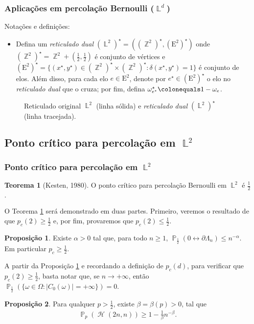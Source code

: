 \documentclass[9pt]{beamer}
\theoremstyle{definition} %
\newtheorem{mythm}{Teorema}
\newtheorem{mypro}{Proposição}
\DeclareMathOperator{\PX}{\mathbb{P}} %
\DeclareMathOperator{\ZX}{\mathbb{Z}} %
\DeclareMathOperator{\LX}{\mathbb{L}} %
\DeclareMathOperator{\HL}{\mathcal{H}} %
\newenvironment{myitemize}
{ \begin{itemize}
	\setlength{\itemsep}{6pt}
	\setlength{\parskip}{0pt}
	\setlength{\parsep}{0pt} }
{ \end{itemize} }
\begin{document}
	\begin{frame}[t]
	\frametitle{Aplicações em percolação Bernoulli ($\LX^d$)}
		Notações e definições:
		\vspace{2.6pt}
		\begin{myitemize}
			\item Defina um \textit{reticulado dual} $(\LX^2)^{\star} = ((\ZX^2)^{\star}, (\text{E}^2)^{\star})$ onde $(\ZX^2)^{\star} = \ZX^2 + \left(\frac{1}{2}, \frac{1}{2}\right)$ é conjunto de vértices e $(\text{E}^2)^{\star} = \{(x^{\star}, y^{\star}) \in (\ZX^2)^{\star} \times (\ZX^2)^{\star} : \delta(x^{\star}, y^{\star}) = 1\}$ é conjunto de elos. Além disso, para cada elo $e \in \text{E}^2$, denote por $e^{\star} \in (\text{E}^2)^{\star}$ o elo no \textit{reticulado dual} que o cruza; por fim, defina $\omega^{\star}_{e^{\star}} \colonequals 1 - \omega_e$.
		\end{myitemize}
		\begin{figure}
			
			\vspace{-3pt}
			\caption{\justifying Reticulado original $\LX^2$ (linha sólida) e \textit{reticulado dual} $(\LX^2)^{\star}$ (linha tracejada).}
			\label{fig:caixas-iteradas}
		\end{figure}
	\end{frame}
	
	\subsection{Ponto crítico para percolação em $\LX^2$}
	\begin{frame}[t]
		\frametitle{Ponto crítico para percolação em $\LX^2$}
		\begin{mythm}[Kesten, 1980] \label{thm:kesten}
			O ponto crítico para percolação Bernoulli em $\LX^2$ é $\frac{1}{2}$.
		\end{mythm}
		\vspace{-3pt}
		O Teorema \ref{thm:kesten} será demonstrado em duas partes. Primeiro, veremos o resultado de que $p_c(2) \geq \frac{1}{2}$ e, por fim, provaremos que $p_c(2) \leq \frac{1}{2}$. \pause
		\begin{mypro}\label{prop:pc-maior-meio}
			Existe $\alpha > 0$ tal que, para todo $n \geq 1$, $\PX_{\frac{1}{2}}(0 \leftrightarrow \partial \Lambda_n) \leq n^{-\alpha}$. Em particular $p_c \geq \frac{1}{2}$.
		\end{mypro}
		\vspace{-3pt}
		A partir da Proposição \ref{prop:pc-maior-meio} e recordando a definição de $p_c(d)$, para verificar que $p_c(2) \geq \frac{1}{2}$, basta notar que, se $n \to +\infty$, então $\PX_{\frac{1}{2}}(\{\omega \in \Omega : |C_0(\omega)| = +\infty\}) = 0$. \pause
		\begin{mypro}\label{prop:beta}
			Para qualquer $p > \frac{1}{2}$, existe $\beta = \beta(p) > 0$, tal que 
			\begin{align*}
			\PX_p(\HL(2n, n)) \geq 1 - \frac{1}{\beta}n^{-\beta}.
			\end{align*}
		\end{mypro}
	\end{frame}
\end{document}
